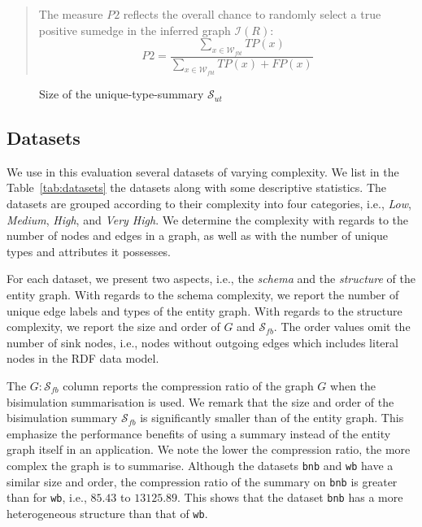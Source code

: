 \begin{quotation}
	The measure $P2$ reflects the overall chance to randomly select a true positive sumedge in the inferred graph $\mathcal{I}(R)$:
	$$
	P2 = \frac{\sum_{x \in \mathcal{W}_{fbt}}{TP(x)}}{\sum_{x \in \mathcal{W}_{fbt}}{TP(x) + FP(x)}}
	$$
\end{quotation}

\begin{figure}
	\centering
	\resizebox{.8\textwidth}{!}{
		
	}
	\caption{Size of the \gls{unique-type-summary} $\mathcal{S}_{ut}$}
	\label{fig:unique-type-summary-size}
\end{figure}
\subsection{Datasets}
\label{sec:eval:datasets}

We use in this evaluation several datasets of varying complexity. We list in the Table~\ref{tab:datasets} the datasets along with some descriptive statistics. The datasets are grouped according to their complexity into four categories, i.e., \emph{Low}, \emph{Medium}, \emph{High}, and \emph{Very High}. We determine the complexity with regards to the number of nodes and edges in a graph, as well as with the number of unique types and attributes it possesses.

For each dataset, we present two aspects, i.e., the \emph{schema} and the \emph{structure} of the entity graph. With regards to the schema complexity, we report the number of unique edge labels and types of the entity graph. With regards to the structure complexity, we report the size and order of $G$ and $\mathcal{S}_{fb}$. The order values omit the number of sink nodes, i.e., nodes without outgoing edges which includes literal nodes in the RDF data model.

The $G:\mathcal{S}_{fb}$ column reports the compression ratio of the graph $G$ when the bisimulation summarisation is used. We remark that the size and order of the bisimulation summary $\mathcal{S}_{fb}$ is significantly smaller than of the entity graph. This emphasize the performance benefits of using a summary instead of the entity graph itself in an application. We note the lower the compression ratio, the more complex the graph is to summarise. Although the datasets \texttt{bnb} and \texttt{wb} have a similar size and order, the compression ratio of the summary on \texttt{bnb} is greater than for \texttt{wb}, i.e., $85.43$ to $13125.89$. This shows that the dataset \texttt{bnb} has a more heterogeneous structure than that of \texttt{wb}.

